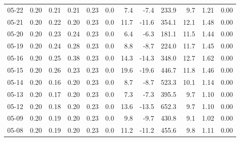 \begin{threeparttable}
{\begin{tabular}{lrrrrrrrrrrr}
  05-22 &          0.20 &          0.21 &          0.21 &        0.23 &                 0.0 &                 7.4 &       -7.4 &               233.9 &              9.7 &            1.21 &                   0.00 \\
  05-21 &          0.20 &          0.22 &          0.20 &        0.23 &                 0.0 &                11.7 &      -11.6 &               354.1 &             12.1 &            1.48 &                   0.00 \\
  05-20 &          0.20 &          0.23 &          0.24 &        0.23 &                 0.0 &                 6.4 &       -6.3 &               181.1 &             11.5 &            1.44 &                   0.00 \\
  05-19 &          0.20 &          0.24 &          0.28 &        0.23 &                 0.0 &                 8.8 &       -8.7 &               224.0 &             11.7 &            1.45 &                   0.00 \\
  05-16 &          0.20 &          0.25 &          0.38 &        0.23 &                 0.0 &                14.3 &      -14.3 &               348.0 &             12.7 &            1.62 &                   0.00 \\
  05-15 &          0.20 &          0.26 &          0.23 &        0.23 &                 0.0 &                19.6 &      -19.6 &               446.7 &             11.8 &            1.46 &                   0.00 \\
  05-14 &          0.20 &          0.16 &          0.20 &        0.23 &                 0.0 &                 8.7 &       -8.7 &               523.3 &             10.1 &            1.14 &                   0.00 \\
  05-13 &          0.20 &          0.17 &          0.20 &        0.23 &                 0.0 &                 7.3 &       -7.3 &               395.5 &              9.7 &            1.10 &                   0.00 \\
  05-12 &          0.20 &          0.18 &          0.20 &        0.23 &                 0.0 &                13.6 &      -13.5 &               652.3 &              9.7 &            1.10 &                   0.00 \\
  05-09 &          0.20 &          0.19 &          0.20 &        0.23 &                 0.0 &                 9.8 &       -9.7 &               430.8 &              9.1 &            1.02 &                   0.00 \\
  05-08 &          0.20 &          0.19 &          0.20 &        0.23 &                 0.0 &                11.2 &      -11.2 &               455.6 &              9.8 &            1.11 &                   0.00 \\

\end{tabular}}
\end{threeparttable}
